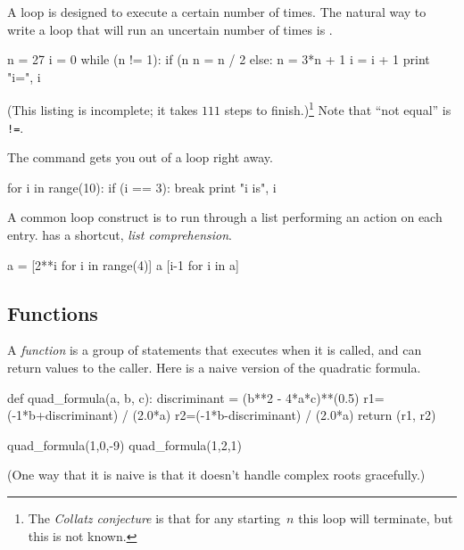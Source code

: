 A  loop is designed to execute a certain
number of times.
The natural way to write a loop that will run an uncertain number of times
is .
\begin{pythonoutput}[d,13,121]
n = 27
i = 0
while (n != 1):
    if (n%
        n = n / 2
    else:
        n = 3*n + 1
    i = i + 1
    print "i=", i
 
\end{pythonoutput}
\noindent
(This listing is incomplete; it takes $111$ steps to finish.)\footnote{The 
\protect\textit{Collatz conjecture} is 
that for any starting~$n$ this loop will 
terminate, but this is not known.}
Note that ``not equal'' is \lstinline[style=inline]@!=@. 

The  command gets you out of a loop right away.
\begin{pythonoutput}
for i in range(10):
    if (i == 3):
        break
    print "i is", i

\end{pythonoutput}

A common loop construct is to run through a list
performing an action on each entry.
\python{} has a shortcut, \textit{list comprehension}.
\begin{pythonoutput}
a = [2**i for i in range(4)]
a
[i-1 for i in a]
\end{pythonoutput}



\subsection{Functions}
A \textit{function} is a group of statements that executes when it is called,
and can return values to the caller.
Here is a naive version of the quadratic formula.
\begin{pythonoutput}
def quad_formula(a, b, c):
    discriminant = (b**2 - 4*a*c)**(0.5)
    r1=(-1*b+discriminant) / (2.0*a)
    r2=(-1*b-discriminant) / (2.0*a)
    return (r1, r2)

quad_formula(1,0,-9)
quad_formula(1,2,1)
\end{pythonoutput}
\noindent
(One way that it is naive is that it doesn't handle complex roots gracefully.)
%

